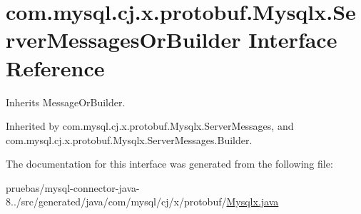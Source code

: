 \hypertarget{interfacecom_1_1mysql_1_1cj_1_1x_1_1protobuf_1_1_mysqlx_1_1_server_messages_or_builder}{}\section{com.\+mysql.\+cj.\+x.\+protobuf.\+Mysqlx.\+Server\+Messages\+Or\+Builder Interface Reference}
\label{interfacecom_1_1mysql_1_1cj_1_1x_1_1protobuf_1_1_mysqlx_1_1_server_messages_or_builder}


Inherits Message\+Or\+Builder.



Inherited by com.\+mysql.\+cj.\+x.\+protobuf.\+Mysqlx.\+Server\+Messages, and com.\+mysql.\+cj.\+x.\+protobuf.\+Mysqlx.\+Server\+Messages.\+Builder.



The documentation for this interface was generated from the following file\+:\begin{DoxyCompactItemize}
\item 
pruebas/mysql-\/connector-\/java-\/8../src/generated/java/com/mysql/cj/x/protobuf/\mbox{\hyperlink{_mysqlx_8java}{Mysqlx.\+java}}\end{DoxyCompactItemize}

